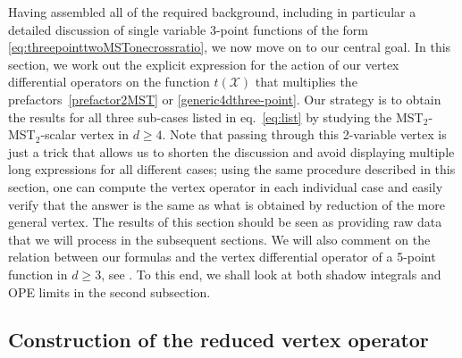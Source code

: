 \documentclass{article}
\begin{document}
Having assembled all of the required background, including in particular 
a detailed discussion of 
single variable 3-point functions of the form \eqref{eq:threepointtwoMSTonecrossratio}, we now move on to our central goal. In this 
section, we work out the explicit expression for the action of our vertex 
differential operators on the function $t(\mathcal{X})$ that multiplies the 
prefactors~\eqref{prefactor2MST} or \eqref{generic4dthree-point}. Our strategy 
is to obtain the results for all three sub-cases listed in eq.\ \eqref{eq:list}
by studying the MST$_2$-MST$_2$-scalar vertex in $d \geq 4$. Note that passing 
through this 2-variable vertex is just a trick that allows us to shorten the 
discussion and avoid displaying multiple long expressions for all different 
cases; using the same procedure described in this section, one can compute 
the vertex operator in each individual case and easily verify that the 
answer is the same as what is obtained by reduction of the more general 
vertex. The results of this section should be seen as 
providing raw data that we will process in the subsequent sections. We 
will also comment on the relation between our formulas and the vertex 
differential operator of a 5-point function in $d\geq 3$, see 
\cite{Buric:2021ywo}. To this end, we shall look at both shadow 
integrals and OPE limits in the second subsection. 

\subsection{Construction of the reduced vertex operator}
\end{document}
